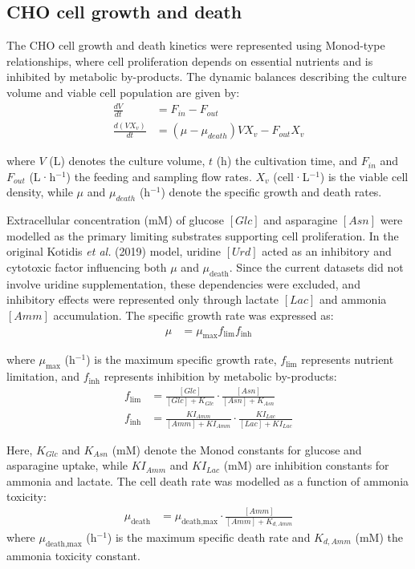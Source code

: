 \label{model}

\subsection*{CHO cell growth and death}

The CHO cell growth and death kinetics were represented using Monod-type relationships, where cell proliferation depends on essential nutrients and is inhibited by metabolic by-products. The dynamic balances describing the culture volume and viable cell population are given by:\begin{align}
\frac{dV}{dt} &= F_{in} - F_{out} \\
\frac{d(VX_v)}{dt} &= (\mu - \mu_{death})V X_v - F_{out} X_v
\end{align}

\noindent where $V$ (L) denotes the culture volume, $t$ (h) the cultivation time, and $F_{in}$ and $F_{out}$ (L·h$^{-1}$) the feeding and sampling flow rates. $X_v$ (cell·L$^{-1}$) is the viable cell density, while $\mu$ and $\mu_{death}$ (h$^{-1}$) denote the specific growth and death rates.

Extracellular concentration (mM) of glucose $[Glc]$ and asparagine $[Asn]$ were modelled as the primary limiting substrates supporting cell proliferation. In the original Kotidis \textit{et al.} (2019) model, uridine $[Urd]$ acted as an inhibitory and cytotoxic factor influencing both $\mu$ and $\mu_{\text{death}}$. Since the current datasets did not involve uridine supplementation, these dependencies were excluded, and inhibitory effects were represented only through lactate $[Lac]$ and ammonia $[Amm]$ accumulation. The specific growth rate was expressed as:
\begin{align}
\mu &= \mu_{\text{max}} f_{\text{lim}} f_{\text{inh}}
\end{align}

\noindent where $\mu_{\text{max}}$ (h$^{-1}$) is the maximum specific growth rate, $f_{\text{lim}}$ represents nutrient limitation, and $f_{\text{inh}}$ represents inhibition by metabolic by-products:
\begin{align}
f_{\text{lim}} &= \frac{[Glc]}{[Glc] + K_{Glc}} \cdot \frac{[Asn]}{[Asn] + K_{Asn}} \\
f_{\text{inh}} &= \frac{KI_{Amm}}{[Amm] + KI_{Amm}} \cdot \frac{KI_{Lac}}{[Lac] + KI_{Lac}}
\end{align}

\noindent Here, $K_{Glc}$ and $K_{Asn}$ (mM) denote the Monod constants for glucose and asparagine uptake, while $KI_{Amm}$ and $KI_{Lac}$ (mM) are inhibition constants for ammonia and lactate. The cell death rate was modelled as a function of ammonia toxicity:
\begin{align}
\mu_{\text{death}} &= \mu_{\text{death,max}} \cdot \frac{[Amm]}{[Amm] + K_{d,Amm}}
\end{align}
\noindent where $\mu_{\text{death,max}}$ (h$^{-1}$) is the maximum specific death rate and $K_{d,Amm}$ (mM) the ammonia toxicity constant.


